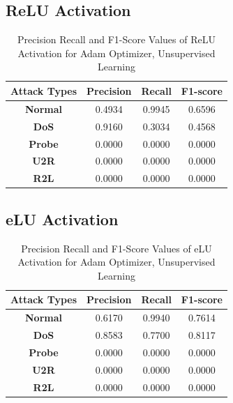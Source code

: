 \documentclass[12pt, a4paper]{report}
\begin{document}
\begin{appendices}
  
  \subsection{ReLU Activation}
  \begin{table}[h]
		\centering
		\captionsetup{justification=centering,margin=2cm}
		\begin{tabular}{|c|c|c|c|}
		\hline
		\textbf{Attack Types} & \textbf{Precision} & \textbf{Recall} & \textbf{F1-score} \\ \hline
		\textbf{Normal}       & 0.4934             & 0.9945          & 0.6596            \\ \hline
		\textbf{DoS}          & 0.9160             & 0.3034          & 0.4568            \\ \hline
		\textbf{Probe}        & 0.0000             & 0.0000          & 0.0000            \\ \hline
		\textbf{U2R}          & 0.0000             & 0.0000          & 0.0000            \\ \hline
		\textbf{R2L}          & 0.0000             & 0.0000          & 0.0000            \\ \hline
		\end{tabular}
		\caption{Precision Recall and F1-Score Values of ReLU Activation for Adam Optimizer, Unsupervised Learning}
		\label{classification ReLU adam tf}
		\end{table} 
\clearpage
   \subsection{eLU Activation}
  \begin{table}[h]
		\centering
		\captionsetup{justification=centering,margin=2cm}
		\begin{tabular}{|c|c|c|c|}
		\hline
		\textbf{Attack Types} & \textbf{Precision} & \textbf{Recall} & \textbf{F1-score} \\ \hline
		\textbf{Normal}       & 0.6170             & 0.9940          & 0.7614            \\ \hline
		\textbf{DoS}          & 0.8583             & 0.7700          & 0.8117            \\ \hline
		\textbf{Probe}        & 0.0000             & 0.0000          & 0.0000            \\ \hline
		\textbf{U2R}          & 0.0000             & 0.0000          & 0.0000            \\ \hline
		\textbf{R2L}          & 0.0000             & 0.0000          & 0.0000            \\ \hline
		\end{tabular}
		\caption{Precision Recall and F1-Score Values of eLU Activation for Adam Optimizer, Unsupervised Learning}
		\label{classification eLU adam tf}
		\end{table} 
  

\end{appendices}
\end{document}

